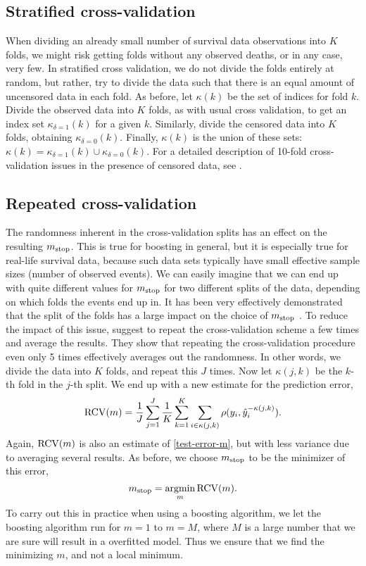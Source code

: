 \subsection{Stratified cross-validation}
When dividing an already small number of survival data observations into $K$ folds, we might risk getting folds without any observed deaths, or in any case, very few. In stratified cross validation, we do not divide the folds entirely at random, but rather, try to divide the data such that there is an equal amount of uncensored data in each fold.
As before, let $\kappa(k)$ be the set of indices for fold $k$.
Divide the observed data into $K$ folds, as with usual cross validation, to get an index set $\kappa_{\delta=1}(k)$ for a given $k$. 
Similarly, divide the censored data into $K$ folds, obtaining $\kappa_{\delta=0}(k)$.
Finally, $\kappa(k)$ is the union of these sets: $\kappa(k)=\kappa_{\delta=1}(k)\cup\kappa_{\delta=0}(k)$.
For a detailed description of 10-fold cross-validation issues in the presence of censored data, see \citet{kohavi}.

\subsection{Repeated cross-validation}
The randomness inherent in the cross-validation splits has an effect on the resulting $m_{\text{stop}}$.
This is true for boosting in general, but it is especially true for real-life survival data, because such data sets typically have small effective sample sizes (number of observed events).
We can easily imagine that we can end up with quite different values for $m_{\text{stop}}$ for two different splits of the data, depending on which folds the events end up in.
It has been very effectively demonstrated that the split of the folds has a large impact on the choice of $m_{\text{stop}}$ \citep{seibold}.
To reduce the impact of this issue, \citet{seibold} suggest to repeat the cross-validation scheme a few times and average the results.
They show that repeating the cross-validation procedure even only 5 times effectively averages out the randomness.
In other words, we divide the data into $K$ folds, and repeat this $J$ times.
Now let $\kappa(j, k)$ be the $k$-th fold in the $j$-th split.
We end up with a new estimate for the prediction error,
\begin{equation*}
    \operatorname{RCV}(m)=\frac{1}{J}\sum_{j=1}^J\frac{1}{K}\sum_{k=1}^K\sum_{i\in\kappa(j,k)}\rho(y_i,\hat{y}_i^{-\kappa(j,k)}).
\end{equation*}
Again, $\operatorname{RCV}(m)$ is also an estimate of \eqref{test-error-m}, but with less variance due to averaging several results.
As before, we choose $m_{\text{stop}}$ to be the minimizer of this error,
\begin{equation*}
    m_{\text{stop}}=\operatorname*{argmin}_{m}\operatorname{RCV}(m).
\end{equation*}
To carry out this in practice when using a boosting algorithm, we let the boosting algorithm run for $m=1$ to $m=M$, where $M$ is a large number that we are sure will result in a overfitted model.
Thus we ensure that we find the minimizing $m$, and not a local minimum.

